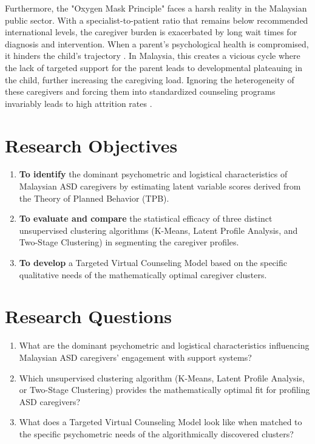 Furthermore, the "Oxygen Mask Principle" faces a harsh reality in the Malaysian public sector. With a specialist-to-patient ratio that remains below recommended international levels, the caregiver burden is exacerbated by long wait times for diagnosis and intervention. When a parent's psychological health is compromised, it hinders the child's trajectory \citep{Rusu2025_94, SnchezAmate2024_95, Palmer2020_83}. In Malaysia, this creates a vicious cycle where the lack of targeted support for the parent leads to developmental plateauing in the child, further increasing the caregiving load. Ignoring the heterogeneity of these caregivers and forcing them into standardized counseling programs invariably leads to high attrition rates \citep{Wang2025_74, Liu2025_72}.

\section{Research Objectives}
\begin{enumerate}
    \item \textbf{To identify} the dominant psychometric and logistical characteristics of Malaysian ASD caregivers by estimating latent variable scores derived from the Theory of Planned Behavior (TPB).
    \item \textbf{To evaluate and compare} the statistical efficacy of three distinct unsupervised clustering algorithms (K-Means, Latent Profile Analysis, and Two-Stage Clustering) in segmenting the caregiver profiles.
    \item \textbf{To develop} a Targeted Virtual Counseling Model based on the specific qualitative needs of the mathematically optimal caregiver clusters.
\end{enumerate}

\section{Research Questions}
\begin{enumerate}
    \item What are the dominant psychometric and logistical characteristics influencing Malaysian ASD caregivers' engagement with support systems?
    \item Which unsupervised clustering algorithm (K-Means, Latent Profile Analysis, or Two-Stage Clustering) provides the mathematically optimal fit for profiling ASD caregivers?
    \item What does a Targeted Virtual Counseling Model look like when matched to the specific psychometric needs of the algorithmically discovered clusters?
\end{enumerate}


